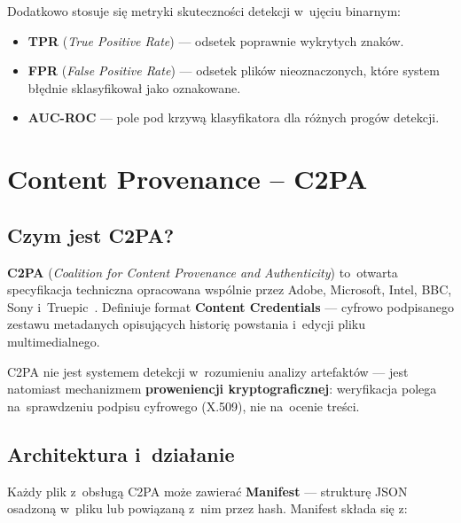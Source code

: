 Dodatkowo stosuje si\k{e} metryki skuteczno\'{s}ci detekcji
w~uj\k{e}ciu binarnym:
\begin{itemize}
  \item \textbf{TPR} (\textit{True Positive Rate}) ---
        odsetek poprawnie wykrytych znak\'{o}w.
  \item \textbf{FPR} (\textit{False Positive Rate}) ---
        odsetek plik\'{o}w nieoznaczonych, kt\'{o}re system
        b\l{}\k{e}dnie sklasyfikowa\l{} jako oznakowane.
  \item \textbf{AUC-ROC} ---
        pole pod krzyw\k{a} klasyfikatora dla r\'{o}\.{z}nych
        prog\'{o}w detekcji.
\end{itemize}

\section{Content Provenance -- C2PA}
\label{sec:c2pa}

\subsection{Czym jest C2PA?}
\label{sec:c2pa_opis}

\textbf{C2PA} (\textit{Coalition for Content Provenance and Authenticity})
to~otwarta specyfikacja techniczna opracowana wsp\'{o}lnie przez
Adobe, Microsoft, Intel, BBC, Sony i~Truepic~\cite{C2PA2024Spec}.
Definiuje format \textbf{Content Credentials} --- cyfrowo podpisanego
zestawu metadanych opisuj\k{a}cych histori\k{e} powstania
i~edycji pliku multimedialnego.

C2PA nie jest systemem detekcji w~rozumieniu analizy artefakt\'{o}w ---
jest natomiast mechanizmem \textbf{proweniencji kryptograficznej}:
weryfikacja polega na~sprawdzeniu podpisu cyfrowego (X.509),
nie na~ocenie tre\'{s}ci.

\subsection{Architektura i~dzia\l{}anie}
\label{sec:c2pa_architektura}

Ka\.{z}dy plik z~obs\l{}ug\k{a} C2PA mo\.{z}e zawiera\'{c}
\textbf{Manifest} --- struktur\k{e} JSON osadzon\k{a} w~pliku
lub powi\k{a}zan\k{a} z~nim przez hash. Manifest sk\l{}ada si\k{e} z:

